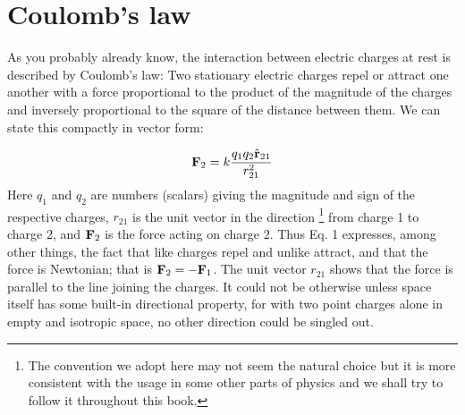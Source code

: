 \section{Coulomb's law}

 As you probably already know, the interaction
between electric charges at rest is described by Coulomb's law: Two
stationary electric charges repel or attract one another with a force
proportional to the product of the magnitude of the charges and
inversely proportional to the square of the distance between them. We
can state this compactly in vector form: 

\begin{equation}
  \mathbf{F}_2=k\frac{q_1q_2\hat{\mathbf{r}}_{21}}{r_{21}^2}
\end{equation}
\noindent Here
$q_1$ and $q_2$ are numbers (scalars) giving the magnitude and sign
of the respective charges, $r_{21}$ is the unit vector in the direction
\footnote{The convention we adopt here may not seem the natural
choice but it is more consistent with the usage in some other parts
of physics and we shall try to follow it throughout this book.} from
charge 1 to charge 2, and $\mathbf{F}_2$ is the force acting on charge 2. Thus
Eq. 1 expresses, among other things, the fact that like charges repel
and unlike attract, and that the force is Newtonian; that is
$\mathbf{F}_2=-\mathbf{F}_1$. The unit vector $r_{21}$ shows that the force is parallel
to the line joining the charges. It could not be otherwise unless
space itself has some built-in directional property, for with two
point charges alone in empty and isotropic space, no other direction
could be singled out.

